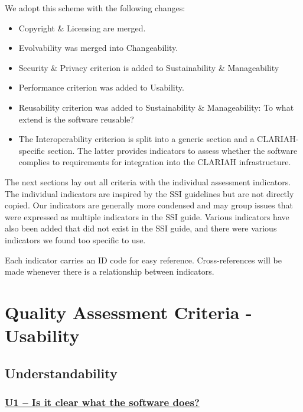 \documentclass[a4paper,11pt]{article}
\newcommand{\indicator}[1]{\subsubsection*{\underline{#1}}}
\begin{document}
We adopt this scheme with the following changes:

\begin{itemize}
\item Copyright \& Licensing are merged.
\item Evolvability was merged into Changeability.
\item Security \& Privacy criterion is added to Sustainability \& Manageability
\item Performance criterion was added to Usability.
\item Reusability criterion was added to Sustainability \& Manageability: To what extend is the software reusable?
%
%
%
\item The Interoperability criterion is split into a generic section and a CLARIAH-specific section. The latter provides indicators to assess
whether the software complies to requirements for integration into the CLARIAH infrastructure.
\end{itemize}

The next sections lay out all criteria with the individual assessment
indicators. The individual indicators are inspired by the SSI guidelines but
are not directly copied. Our indicators are generally more condensed and may
group issues that were expressed as multiple indicators in the SSI guide.
Various indicators have also been added that did not exist in the SSI guide,
and there were various indicators we found too specific to use.

Each indicator carries an ID code for easy reference. Cross-references will be
made whenever there is a relationship between indicators.

\section{Quality Assessment Criteria - Usability}

\subsection{Understandability}

\indicator{U1 -- Is it clear what the software does?}
\end{document}
